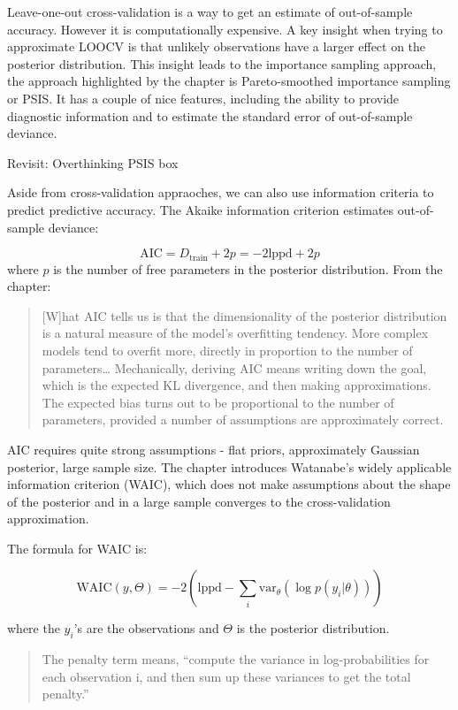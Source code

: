 \documentclass[
]{book}
\begin{document}
Leave-one-out cross-validation is a way to get an estimate of out-of-sample accuracy. However it is computationally expensive. A key insight when trying to approximate LOOCV is that unlikely observations have a larger effect on the posterior distribution. This insight leads to the importance sampling approach, the approach highlighted by the chapter is Pareto-smoothed importance sampling or PSIS. It has a couple of nice features, including the ability to provide diagnostic information and to estimate the standard error of out-of-sample deviance.

Revisit: Overthinking PSIS box

Aside from cross-validation appraoches, we can also use information criteria to predict predictive accuracy. The Akaike information criterion estimates out-of-sample deviance:

\[
\text{AIC}=D_\text{train} + 2p = -2\text{lppd}+2p
\]
where \(p\) is the number of free parameters in the posterior distribution. From the chapter:

\begin{quote}
{[}W{]}hat AIC tells us is that the dimensionality of the posterior distribution is a natural measure of the model's overfitting tendency. More complex models tend to overfit more, directly in proportion to the number of parameters\ldots{} Mechanically, deriving AIC means writing down the goal, which is the expected KL divergence, and then making approximations. The expected bias turns out to be proportional to the number of parameters, provided a number of assumptions are approximately correct.
\end{quote}

AIC requires quite strong assumptions - flat priors, approximately Gaussian posterior, large sample size. The chapter introduces Watanabe's widely applicable information criterion (WAIC), which does not make assumptions about the shape of the posterior and in a large sample converges to the cross-validation approximation.

The formula for WAIC is:

\[
\text{WAIC}(y,\Theta) = -2 \left( \text{lppd} - \sum_i \text{var}_\theta ( \log p(y_i | \theta)) \right)
\]

where the \(y_i\)'s are the observations and \(\Theta\) is the posterior distribution.

\begin{quote}
The penalty term means, ``compute the variance in log-probabilities for each observation i, and then sum up these variances to get the total penalty.''
\end{quote}
\end{document}
